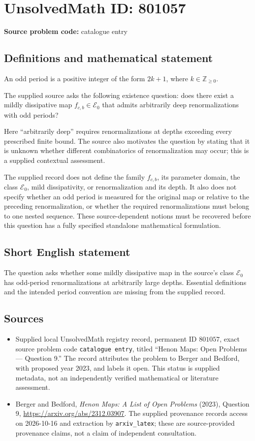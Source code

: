 \documentclass[11pt]{article}
\newcommand{\Z}{\mathbb{Z}}
\begin{document}
\section*{UnsolvedMath ID: 801057}
\textbf{Source problem code:} catalogue entry
\subsection{Definitions and mathematical statement}
An odd period is a positive integer of the form \(2k+1\), where \(k\in\Z_{\geq 0}\).

The supplied source asks the following existence question: does there exist a mildly dissipative map \(f_{c,b}\in\mathcal E_0\) that admits arbitrarily deep renormalizations with odd periods?

Here ``arbitrarily deep'' requires renormalizations at depths exceeding every prescribed finite bound. The source also motivates the question by stating that it is unknown whether different combinatorics of renormalization may occur; this is a supplied contextual assessment.

The supplied record does not define the family \(f_{c,b}\), its parameter domain, the class \(\mathcal E_0\), mild dissipativity, or renormalization and its depth. It also does not specify whether an odd period is measured for the original map or relative to the preceding renormalization, or whether the required renormalizations must belong to one nested sequence. These source-dependent notions must be recovered before this question has a fully specified standalone mathematical formulation.
\subsection{Short English statement}
The question asks whether some mildly dissipative map in the source's class \(\mathcal E_0\) has odd-period renormalizations at arbitrarily large depths. Essential definitions and the intended period convention are missing from the supplied record.
\subsection{Sources}
\begin{itemize}
\item Supplied local UnsolvedMath registry record, permanent ID \(801057\), exact source problem code \texttt{catalogue entry}, titled ``Henon Maps: Open Problems --- Question 9.'' The record attributes the problem to Berger and Bedford, with proposed year 2023, and labels it open. This status is supplied metadata, not an independently verified mathematical or literature assessment.
\item Berger and Bedford, \emph{Henon Maps: A List of Open Problems} (2023), Question 9, \url{https://arxiv.org/abs/2312.03907}. The supplied provenance records access on 2026-10-16 and extraction by \texttt{arxiv\_latex}; these are source-provided provenance claims, not a claim of independent consultation.
\end{itemize}
\end{document}
